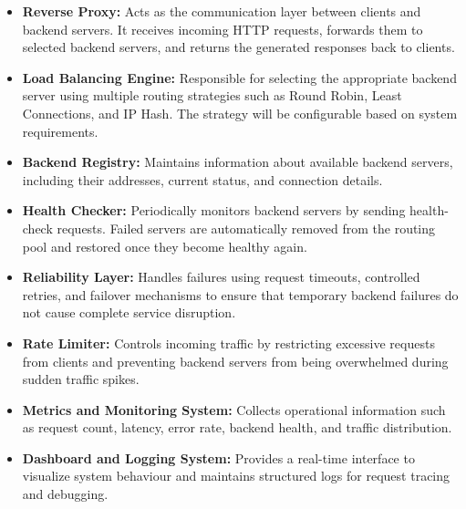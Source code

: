 \documentclass[11pt,a4paper]{article}
\begin{document}
\begin{itemize}
    \item \textbf{Reverse Proxy:} Acts as the communication layer between clients and backend servers. It receives incoming HTTP requests, forwards them to selected backend servers, and returns the generated responses back to clients.

    \item \textbf{Load Balancing Engine:} Responsible for selecting the appropriate backend server using multiple routing strategies such as Round Robin, Least Connections, and IP Hash. The strategy will be configurable based on system requirements.

    \item \textbf{Backend Registry:} Maintains information about available backend servers, including their addresses, current status, and connection details.

    \item \textbf{Health Checker:} Periodically monitors backend servers by sending health-check requests. Failed servers are automatically removed from the routing pool and restored once they become healthy again.

    \item \textbf{Reliability Layer:} Handles failures using request timeouts, controlled retries, and failover mechanisms to ensure that temporary backend failures do not cause complete service disruption.

    \item \textbf{Rate Limiter:} Controls incoming traffic by restricting excessive requests from clients and preventing backend servers from being overwhelmed during sudden traffic spikes.

    \item \textbf{Metrics and Monitoring System:} Collects operational information such as request count, latency, error rate, backend health, and traffic distribution.

    \item \textbf{Dashboard and Logging System:} Provides a real-time interface to visualize system behaviour and maintains structured logs for request tracing and debugging.
\end{itemize}
\end{document}
